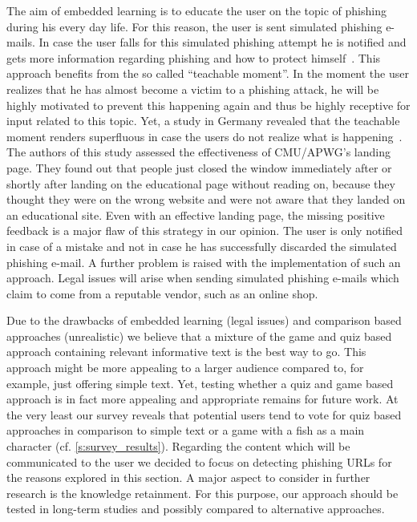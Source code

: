 \begin{description}[leftmargin=0cm]
	\item[Emdedded Learning:] The aim of embedded learning is to educate the user on the topic of phishing during his every day life.
 For this reason, the user is sent simulated phishing e-mails.
 In case the user falls for this simulated phishing attempt he is notified and gets more information regarding phishing and how to protect himself~\cite{embedded2011jansson, kumaraguru2009phishguru}. 
This approach benefits from the so called ``teachable moment''. 
In the moment the user realizes that he has almost become a victim to a phishing attack, he will be highly motivated to prevent this happening again and thus be highly receptive for input related to this topic.
 Yet, a study in Germany revealed that the teachable moment renders superfluous in case the users do not realize what is happening~\cite{TUD-CS-2013-0167}.
 The authors of this study assessed the effectiveness of CMU/APWG's landing page. 
They found out that people just closed the window immediately after or shortly after landing on the educational page without reading on,  because they thought they were on the wrong website and were not aware that they landed on an educational site.
 Even with an effective landing page, the missing positive feedback is a major flaw of this strategy in our opinion.
 The user is only notified in case of a mistake and not in case he has successfully discarded the simulated phishing e-mail.
 A further problem is raised with the implementation of such an approach.
 Legal issues will arise when sending simulated phishing e-mails which claim to come from a reputable vendor, such as an online shop.
\end{description}
Due to the drawbacks of embedded learning (legal issues) and comparison based approaches (unrealistic) we believe that a mixture of the game and quiz based approach containing relevant informative text is the best way to go.
This approach might be more appealing to a larger audience compared to, for example, just offering simple text.
Yet, testing whether a quiz and game based approach is in fact more appealing and appropriate remains for future work.
At the very least our survey reveals that potential users tend to vote for quiz based approaches in comparison to simple text or a game with a fish as a main character (cf. \autoref{s:survey_results}).
Regarding the content which will be communicated to the user we decided to focus on detecting phishing URLs for the reasons explored in this section.
A major aspect to consider in further research is the knowledge retainment.
For this purpose, our approach should be tested in long-term studies and possibly compared to alternative approaches.